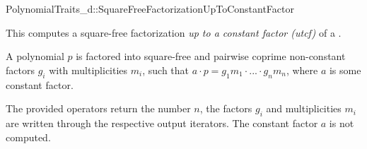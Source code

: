 \begin{ccRefConcept}{PolynomialTraits_d::SquareFreeFactorizationUpToConstantFactor}

\ccDefinition

This  computes a square-free factorization 
{\em up to a constant factor (utcf)} of a 
. 

A polynomial $p$ is factored into square-free and pairwise coprime non-constant
factors $g_i$ with multiplicities $m_i$, such that 
$a  \cdot  p = g_1m_1  \cdot  ...  \cdot  g_nm_n$, where $a$ is some constant factor. 

The provided operators return the number $n$, the factors $g_i$ and 
multiplicities $m_i$ are written through the respective output iterators.
The constant factor $a$ is not computed.
          
\ccRefines 

\ccTypes

\ccOperations



% 
%          




\end{ccRefConcept}
